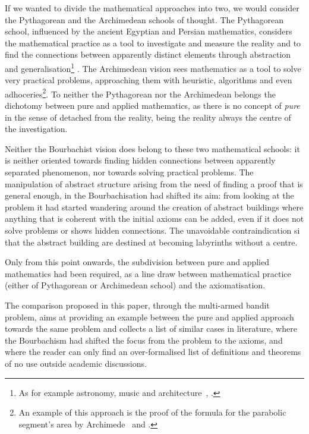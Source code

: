 \documentclass[]{scrartcl}
\theoremstyle{definition}
\begin{document}
If we wanted to divide the mathematical approaches into two, we would consider the Pythagorean and the Archimedean schools of thought. The Pythagorean school, influenced by the ancient Egyptian and Persian mathematics, considers the mathematical practice as a tool to investigate and measure the reality and to find the connections between apparently distinct elements through abstraction and generalisation\footnote{
    As for example astronomy, music and architecture~\cite{robins1995mathematics}, \cite{boyer2011history}.
}
. The Archimedean vision sees mathematics as a tool to solve very practical problems, approaching them with heuristic, algorithms and even adhoceries\footnote{
    An example of this approach is the proof of the formula for the parabolic segment's area by Archimede~\cite{boyer2011history} and \cite{strogatz2019infinite}.
}. To neither the Pythagorean nor the Archimedean belongs the dichotomy between pure and applied mathematics, as there is no concept of \emph{pure} in the sense of detached from the reality, being the reality always the centre of the investigation.

Neither the Bourbachist vision does belong to these two mathematical schools: it is neither oriented towards finding hidden connections between apparently separated phenomenon, nor towards solving practical problems. The manipulation of abstract structure arising from the need of finding a proof that is general enough, in the Bourbachisation had shifted its aim: from looking at the problem it had started wandering around the creation of abstract buildings where anything that is coherent with the initial axioms can be added, even if it does not solve problems or shows hidden connections. The unavoidable contraindication si that the abstract building are destined at becoming labyrinths without a centre.

Only from this point onwards, the subdivision between pure and applied mathematics had been required, as a line draw between mathematical practice (either of Pythagorean or Archimedean school) and the axiomatisation.

The comparison proposed in this paper, through the multi-armed bandit problem, aims at providing an example between the pure and applied approach towards the same problem and collects a list of similar cases in literature, where the Bourbachism had shifted the focus from the problem to the axioms, and where the reader can only find an over-formalised list of definitions and theorems of no use outside academic discussions.
\end{document}
